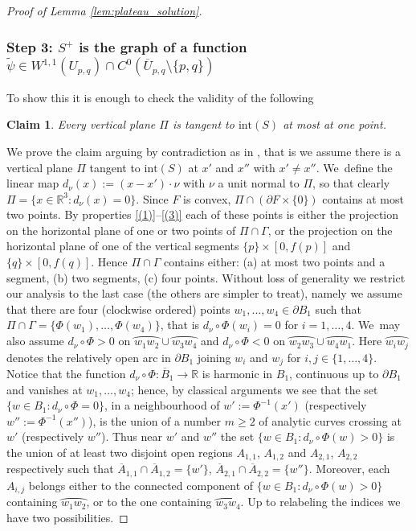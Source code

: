 \documentclass[JEP,XML,SOM,Unicode, NoFloatCountersInSection,published]{cedram}
\newcommand{\R}{\mathbb{R}}
\let\arc\wideparen
\newtheorem*{claim*}{Claim}
\theoremstyle{definition}
\begin{document}
\begin{proof}[Proof of Lemma \ref{lem:plateau_solution}]
\subsubsection*{Step 3: $S^+$
is the graph of a function $\widetilde \psi\in W^{1,1}(U_{p,q})\cap C^0(\overline U_{p,q}\setminus{\{p,q\}})$}
To show this it is enough to
check the validity of the following

\begin{claim*}
Every vertical plane $\Pi$ is tangent to $\mathrm{int}(S)$ at most at one point.
\end{claim*}

We prove the claim arguing by contradiction as in
\cite[p.\,97]{vortex}, that is we assume there is a vertical plane $\Pi$ tangent to $\mathrm{int}(S)$ at $x'$ and $x''$ with $x'\ne x''$. We~define the linear map $d_\nu(x):=(x-x')\cdot\nu $ with $\nu$ a unit normal to $\Pi$, so that clearly $\Pi=\{x\in\R^3\colon d_\nu(x)=0\}$.
Since $F$ is convex, $\Pi\cap (\partial F\times\{0\})$ contains at most two points. By properties \ref{(1)}--\ref{(3)} each of these points is either the projection on the horizontal plane of one or two points of $\Pi\cap\Gamma$, or the projection on the horizontal plane of one of the vertical segments $\{p\}\times[0,f(p)]$ and $\{q\}\times[0,f(q)]$. Hence $\Pi\cap \Gamma$ contains either: (a) at most two points and a segment, (b) two segments, (c) four points.
Without loss of generality we restrict our analysis to the last case (the others are simpler to treat), namely we assume that there are four (clockwise ordered) points $w_1,\dots,w_4\in\partial B_1$ such that
$\Pi\cap\Gamma=\{\Phi(w_1),\dots,\Phi(w_4)\}$, that is $d_\nu\circ\Phi(w_i)=0$ for $i=1,\dots,4$. We~may also assume
$d_\nu\circ\Phi>0$ on $\arc{w_1w_2}\cup\arc{w_3w_4}$ and
$d_\nu\circ\Phi<0$ on $\arc{w_2w_3}\cup\arc{w_4w_1}$. Here $\arc{w_iw_j}$ denotes the relatively open arc in $\partial B_1$ joining $w_i$ and $w_j$ for $i,j\in\{1,\dots,4\}$.
Notice that the function $d_\nu\circ\Phi\colon \overline B_1\to \R$ is harmonic in $B_1$, continuous up to $\partial B_1$ and vanishes at $w_1,\dots,w_4$; hence,
by classical arguments \cite[\S 437]{Nitsche:89} we see that the set $\{w\in B_1\colon d_\nu\circ\Phi=0\}$, in a neighbourhood of $w':=\Phi^{-1}(x')$ (respectively $w'':=\Phi^{-1}(x'')$), is the union of a number $m\geq 2$ of analytic curves crossing at $w'$ (respectively $w''$). Thus near $w'$ and $w''$ the set $\{w\in B_1\colon d_\nu\circ\Phi(w)>0\}$ is the union of at least two disjoint open regions $A_{1,1}$, $A_{1,2}$ and $A_{2,1}$, $A_{2,2}$ respectively such that $\overline A_{1,1}\cap\overline A_{1,2}=\{w'\}$, $\overline A_{2,1}\cap\overline A_{2,2}=\{w''\}$. Moreover, each $A_{i,j}$ belongs either to the connected component of $\{w\in B_1\colon d_\nu\circ\Phi(w)>0\}$ containing $\arc{w_1w_2}$,
or to the one containing $\arc{w_3w_4}$. Up to relabeling the indices we have two possibilities.


\end{proof}
\end{document}

